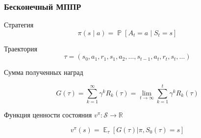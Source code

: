 \documentclass[notheorems]{beamer} %
\begin{document}
\begin{frame}
	\frametitle{Бесконечный МППР}
	\begin{block}{Стратегия}
			$$\pi ( s \mid a) = \mathop{\mathbb{P}}[A_t=a \mid S_t=s] $$
	\end{block}
	\begin{block}{Траектория}
		$$\tau = (s_0, a_1, r_1, s_1, a_2, \dots, s_{t-1}, a_{t}, r_{t}, s_t, \dots)$$
	\end{block}
	
	\begin{block}{Сумма полученных наград}
	 
	$$G(\tau) =  \sum_{k=1}^{\infty}\gamma^kR_k(\tau) = \lim_{t \to \infty} \sum_{k=1}^{t}\gamma^kR_k(\tau) $$
\end{block}

	
	
	\begin{alertblock}{Функция ценности состояния $v^\pi: \mathcal{S} \to \mathbb{R}$}
		
		$$v^\pi(s)= \mathop{\mathbb{E}}_\tau [G(\tau)|\pi,S_0(\tau)=s]$$
	\end{alertblock}
\end{frame}
\end{document}
